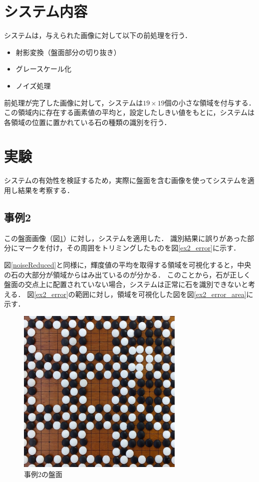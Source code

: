 \documentclass[summary]{nitocs}
\numberwithin{equation}{section}
\begin{document}
    \section{システム内容} \label{system}
        システムは，与えられた画像に対して以下の前処理を行う．
        \begin{itemize}
            \item 射影変換（盤面部分の切り抜き）
            \item グレースケール化
            \item ノイズ処理
        \end{itemize}
        前処理が完了した画像に対して，システムは$19\times19$個の小さな領域を付与する．
        この領域内に存在する画素値の平均と，設定したしきい値をもとに，システムは各領域の位置に置かれている石の種類の識別を行う．

    \section{実験} \label{experiment}
        システムの有効性を検証するため，実際に盤面を含む画像を使ってシステムを適用し結果を考察する．
        \subsection{事例2} %
            この盤面画像（図\ref{ex2}）に対し，システムを適用した．
            識別結果に誤りがあった部分にマークを付け，その周囲をトリミングしたものを図\ref{ex2_error}に示す．

            図\ref{noiseReduced}と同様に，輝度値の平均を取得する領域を可視化すると，中央の石の大部分が領域からはみ出ているのが分かる．
            このことから，石が正しく盤面の交点上に配置されていない場合，システムは正常に石を識別できないと考える．
            図\ref{ex2_error}の範囲に対し，領域を可視化した図を図\ref{ex2_error_area}に示す．
            
            \begin{figure}[tb] %
                \begin{center}
                \includegraphics[clip,width=80mm]{DSC_0099/boardImg.jpg} 
                \caption{事例2の盤面}
                \label{ex2}
                \end{center}
            \end{figure}
\end{document}
